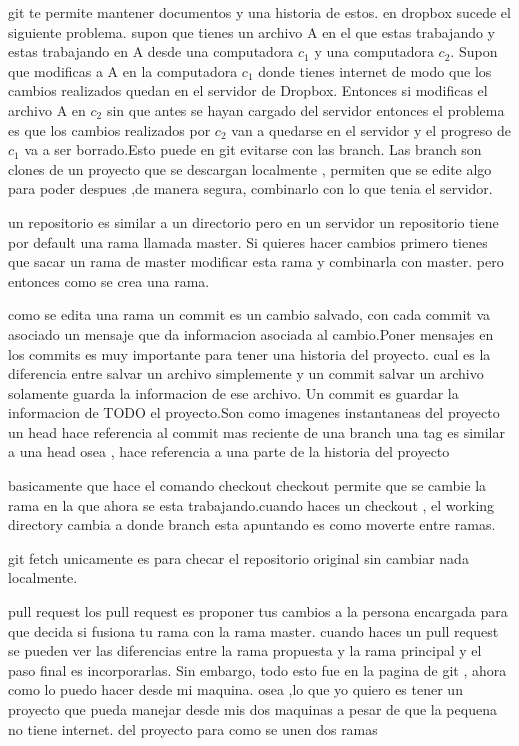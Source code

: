 \documentclass[12p]{article}
\begin{document}
git te permite mantener documentos y una historia de estos.
en dropbox sucede el siguiente problema.
supon que tienes un archivo A en el que estas trabajando y estas
trabajando en A desde una computadora $c_1$ y una computadora $c_2$.
Supon que modificas a A en la computadora $c_1$ donde tienes internet
de modo que los cambios realizados quedan en el servidor de Dropbox.
Entonces si modificas el archivo A en $c_2$ sin que antes se hayan
cargado del servidor entonces el problema es que los cambios realizados
por $c_2$ van a quedarse en el servidor y el progreso de $c_1$ va
a ser borrado.Esto puede en git evitarse con las branch. Las branch
son clones de un proyecto que se descargan localmente , permiten
que se edite algo para poder despues ,de manera segura, combinarlo
con lo que tenia el servidor.

un repositorio es similar a un directorio pero en un servidor
un repositorio tiene por default una rama llamada master.
Si quieres hacer cambios primero tienes que sacar un rama de master
modificar esta rama y combinarla con master.
pero entonces como se crea una rama.

como se edita una rama
un commit es un cambio salvado, con cada commit va asociado un
mensaje que da informacion asociada al cambio.Poner mensajes en
los commits es muy importante para tener una historia del proyecto.
cual es la diferencia entre salvar un archivo simplemente y un commit
salvar un archivo solamente guarda la informacion de ese archivo.
Un commit es guardar la informacion de TODO el proyecto.Son como
imagenes instantaneas del proyecto
un head hace referencia al commit mas reciente de una branch
una tag es similar a una head osea , hace referencia a una parte
de la historia del proyecto

basicamente que hace el comando checkout
checkout permite que se cambie la rama en la que ahora se esta
trabajando.cuando haces un checkout , el working directory cambia
a donde branch esta apuntando es como moverte entre ramas.

git fetch unicamente es para checar el repositorio original
sin cambiar nada localmente.

pull request
los pull request es proponer tus cambios a la persona encargada
para que decida si fusiona tu rama con la rama master.
cuando haces un pull request se pueden ver las diferencias entre
la rama propuesta y la rama principal
y el paso final es incorporarlas.
Sin embargo, todo esto fue en la pagina de git , ahora como lo puedo
hacer desde mi maquina.
osea ,lo que yo quiero es tener un proyecto que pueda manejar desde
mis dos maquinas a pesar de que la pequena no tiene internet.
del proyecto para
como se unen dos ramas 
\end{document}
